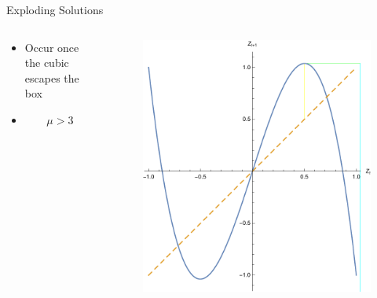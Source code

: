 \documentclass{beamer}
\begin{document}
\begin{frame}{Exploding Solutions}
	\begin{columns}
		\begin{column}{0.5\textwidth}
			\begin{itemize}
				\item
					Occur once the cubic escapes the box
				\item
					\begin{equation*}
						\mu>3
					\end{equation*}
			\end{itemize}
		\end{column}
		\begin{column}{0.5\textwidth}
			\begin{figure}
				\centering
				\includegraphics[height=0.9\textheight]{exploding.pdf}
			\end{figure}
		\end{column}
	\end{columns}
\end{frame}
\end{document}
